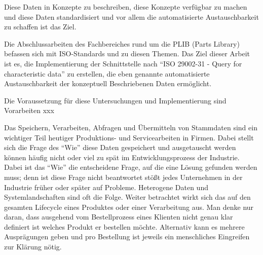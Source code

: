 Diese Daten in Konzepte zu beschreiben, diese Konzepte verfügbar zu machen und diese Daten standardisiert und vor allem die automatisierte Austauschbarkeit zu schaffen ist das Ziel. 

Die Abschlussarbeiten des Fachbereiches rund um die PLIB (Parts Library) befassen sich mit ISO-Standards und zu diesen Themen. Das Ziel dieser Arbeit ist es, die Implementierung der Schnittstelle nach \enquote{ISO 29002-31 - Query for characteristic data} zu erstellen, die eben genannte automatisierte Austauschbarkeit der konzeptuell Beschriebenen Daten ermöglicht. 

Die Voraussetzung für diese Untersuchungen und Implementierung sind Vorarbeiten xxx

Das Speichern, Verarbeiten, Abfragen und Übermitteln von Stammdaten sind ein wichtiger Teil heutiger Produktions- und Servicearbeiten in Firmen. Dabei stellt sich die Frage des \enquote{Wie} diese Daten gespeichert und ausgetauscht werden können häufig nicht oder viel zu spät im Entwicklungsprozess der Industrie. Dabei ist das  \enquote{Wie} die entscheidene Frage, auf die eine Lösung gefunden werden muss; denn ist diese Frage nicht beantwortet stößt jedes Unternehmen in der Industrie früher oder später auf Probleme. Heterogene Daten und Systemlandschaften sind oft die Folge. Weiter betrachtet wirkt sich das auf den gesamten Lifecycle eines Produktes oder einer Verarbeitung aus. Man denke nur daran, dass ausgehend vom Bestellprozess eines Klienten nicht genau klar definiert ist welches Produkt er bestellen möchte. Alternativ kann es mehrere Ausprägungen geben und pro Bestellung ist jeweils ein menschliches Eingreifen zur Klärung nötig. 

